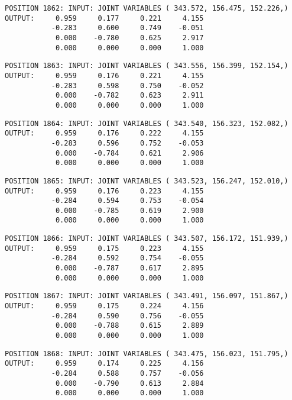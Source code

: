 \begin{verbatim}
POSITION 1862: INPUT: JOINT VARIABLES ( 343.572, 156.475, 152.226,)
OUTPUT:     0.959     0.177     0.221     4.155
           -0.283     0.600     0.749    -0.051
            0.000    -0.780     0.625     2.917
            0.000     0.000     0.000     1.000
\end{verbatim} \pagebreak[1]\begin{verbatim}
POSITION 1863: INPUT: JOINT VARIABLES ( 343.556, 156.399, 152.154,)
OUTPUT:     0.959     0.176     0.221     4.155
           -0.283     0.598     0.750    -0.052
            0.000    -0.782     0.623     2.911
            0.000     0.000     0.000     1.000
\end{verbatim} \pagebreak[1]\begin{verbatim}
POSITION 1864: INPUT: JOINT VARIABLES ( 343.540, 156.323, 152.082,)
OUTPUT:     0.959     0.176     0.222     4.155
           -0.283     0.596     0.752    -0.053
            0.000    -0.784     0.621     2.906
            0.000     0.000     0.000     1.000
\end{verbatim} \pagebreak[1]\begin{verbatim}
POSITION 1865: INPUT: JOINT VARIABLES ( 343.523, 156.247, 152.010,)
OUTPUT:     0.959     0.176     0.223     4.155
           -0.284     0.594     0.753    -0.054
            0.000    -0.785     0.619     2.900
            0.000     0.000     0.000     1.000
\end{verbatim} \pagebreak[1]\begin{verbatim}
POSITION 1866: INPUT: JOINT VARIABLES ( 343.507, 156.172, 151.939,)
OUTPUT:     0.959     0.175     0.223     4.155
           -0.284     0.592     0.754    -0.055
            0.000    -0.787     0.617     2.895
            0.000     0.000     0.000     1.000
\end{verbatim} \pagebreak[1]\begin{verbatim}
POSITION 1867: INPUT: JOINT VARIABLES ( 343.491, 156.097, 151.867,)
OUTPUT:     0.959     0.175     0.224     4.156
           -0.284     0.590     0.756    -0.055
            0.000    -0.788     0.615     2.889
            0.000     0.000     0.000     1.000
\end{verbatim} \pagebreak[1]\begin{verbatim}
POSITION 1868: INPUT: JOINT VARIABLES ( 343.475, 156.023, 151.795,)
OUTPUT:     0.959     0.174     0.225     4.156
           -0.284     0.588     0.757    -0.056
            0.000    -0.790     0.613     2.884
            0.000     0.000     0.000     1.000
\end{verbatim} \pagebreak[1]\begin{verbatim}

\end{verbatim}
